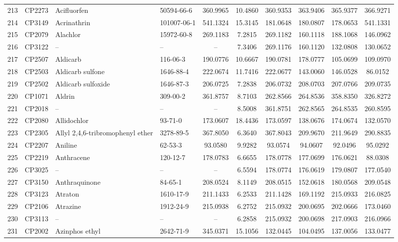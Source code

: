 \begin{longtable}{clllcccccc}
213 & CP2273 & Acifluorfen & 50594-66-6 & 360.9965 & 10.4860 & 360.9353 & 363.9406 & 365.9377 & 366.9271 \\ 
214 & CP3149 & Acrinathrin & 101007-06-1 & 541.1324 & 15.3145 & 181.0648 & 180.0807 & 178.0653 & 541.1331 \\ 
215 & CP2079 & Alachlor & 15972-60-8 & 269.1183 & 7.2815 & 269.1182 & 160.1118 & 188.1068 & 146.0962 \\ 
216 & CP3122 & – & – & – & 7.3406 & 269.1176 & 160.1120 & 132.0808 & 130.0652 \\ 
217 & CP2507 & Aldicarb\smash{\textsuperscript{\textdaggerdbl}} & 116-06-3 & 190.0776 & 10.6667 & 190.0781 & 178.0777 & 105.0699 & 109.0970 \\ 
218 & CP2503 & Aldicarb sulfone & 1646-88-4 & 222.0674 & 11.7416 & 222.0677 & 143.0060 & 146.0528 & 86.0152 \\ 
219 & CP2502 & Aldicarb sulfoxide & 1646-87-3 & 206.0725 & 7.2838 & 206.0732 & 208.0703 & 207.0766 & 209.0735 \\ 
220 & CP1071 & Aldrin & 309-00-2 & 361.8757 & 8.7103 & 262.8566 & 264.8536 & 358.8350 & 326.8272 \\ 
221 & CP2018 & – & – & – & 8.5008 & 361.8751 & 262.8565 & 264.8535 & 260.8595 \\ 
222 & CP2080 & Allidochlor & 93-71-0 & 173.0607 & 18.4436 & 173.0597 & 138.0676 & 174.0674 & 132.0570 \\ 
223 & CP2305 & Allyl 2,4,6-tribromophenyl ether & 3278-89-5 & 367.8050 & 6.3640 & 367.8043 & 209.9670 & 211.9649 & 290.8835 \\ 
224 & CP2207 & Aniline & 62-53-3 & 93.0580 & 9.9282 & 93.0574 & 94.0607 & 92.0496 & 95.0292 \\ 
225 & CP2219 & Anthracene & 120-12-7 & 178.0783 & 6.6655 & 178.0778 & 177.0699 & 176.0621 & 88.0308 \\ 
226 & CP3025 & – & – & – & 6.5594 & 178.0774 & 176.0619 & 179.0807 & 177.0540 \\ 
227 & CP3150 & Anthraquinone & 84-65-1 & 208.0524 & 8.1149 & 208.0515 & 152.0618 & 180.0568 & 209.0548 \\ 
228 & CP3123 & Atraton & 1610-17-9 & 211.1433 & 6.2533 & 211.1428 & 169.1192 & 215.0933 & 216.0825 \\ 
229 & CP2106 & Atrazine & 1912-24-9 & 215.0938 & 6.2752 & 215.0932 & 200.0695 & 202.0666 & 173.0460 \\ 
230 & CP3113 & – & – & – & 6.2858 & 215.0932 & 200.0698 & 217.0903 & 216.0966 \\ 
231 & CP2002 & Azinphos ethyl\smash{\textsuperscript{\textdaggerdbl}} & 2642-71-9 & 345.0371 & 15.1056 & 132.0445 & 104.0495 & 137.0056 & 133.0477 \\ 

\end{longtable}
